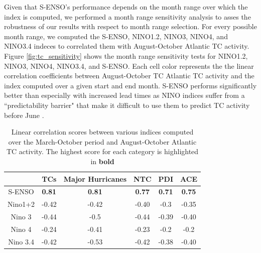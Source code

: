\documentclass[]{article}
\begin{document}
Given that S-ENSO's performance depends on the month range over which the index is computed, we performed a month range sensitivity analysis to asses the robustness of our results with respect to month range selection. For every possible month range, we computed the S-ENSO, NINO1.2, NINO3, NINO4, and NINO3.4 indeces to correlated them with August-October Atlantic TC activity. Figure \ref{fig:tc_sensitivity} shows the month range sensitivity tests for NINO1.2, NINO3, NINO4, NINO3.4, and S-ENSO. Each cell color represents the the linear correlation coefficients between August-October TC Atlantic TC activity and the index computed over a given start and end month. S-ENSO performs significantly better than especially with increased lead times as NINO indices suffer from a ``predictability barrier" that make it difficult to use them to predict TC activity before June \cite{webster1992}.

\begin{table}
\begin{tabular}{cccccc}
\hline
&TCs & Major Hurricanes & NTC & PDI & ACE\\
\hline
S-ENSO  & \textbf{0.81} & \textbf{0.81} & \textbf{0.77} & \textbf{0.71} & \textbf{0.75}\\
Nino1+2 & -0.42 & -0.42 & -0.40 & -0.3 & -0.35\\
Nino 3 & -0.44 & -0.5 & -0.44 & -0.39 & -0.40\\
Nino 4 & -0.24 & -0.41 & -0.23 & -0.2 & -0.2\\
Nino 3.4 & -0.42 & -0.53 & -0.42 & -0.38 & -0.40\\
\hline
\end{tabular}
\caption{Linear correlation scores between various indices computed over the March-October period and August-October Atlantic TC activity. The highest score for each category is highlighted in \textbf{bold}}
\label{ref:lin_corr}
\end{table}
\end{document}
